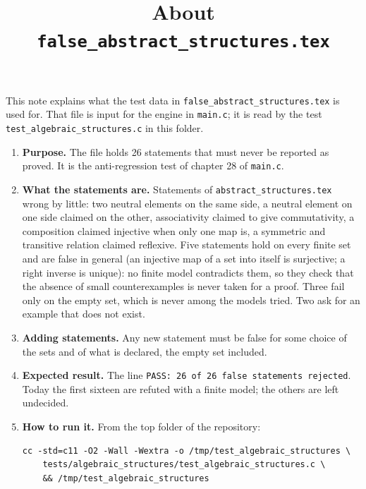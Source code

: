 \documentclass[11pt,a4paper]{article}
\title{About \texttt{false\_abstract\_structures.tex}}
\author{}
\date{}
\begin{document}
\maketitle
This note explains what the test data in \texttt{false\_abstract\_structures.tex} is used for. That file is input for the engine in \texttt{main.c}; it is read by the test \texttt{test\_algebraic\_structures.c} in this folder.

\begin{enumerate}
\item \textbf{Purpose.} The file holds 26 statements that must never be reported as proved. It is the anti-regression test of chapter 28 of \texttt{main.c}.

\item \textbf{What the statements are.} Statements of \texttt{abstract\_structures.tex} wrong by little: two neutral elements on the same side, a neutral element on one side claimed on the other, associativity claimed to give commutativity, a composition claimed injective when only one map is, a symmetric and transitive relation claimed reflexive. Five statements hold on every finite set and are false in general (an injective map of a set into itself is surjective; a right inverse is unique): no finite model contradicts them, so they check that the absence of small counterexamples is never taken for a proof. Three fail only on the empty set, which is never among the models tried. Two ask for an example that does not exist.

\item \textbf{Adding statements.} Any new statement must be false for some choice of the sets and of what is declared, the empty set included.

\item \textbf{Expected result.} The line \texttt{PASS: 26 of 26 false statements rejected}. Today the first sixteen are refuted with a finite model; the others are left undecided.

\item \textbf{How to run it.} From the top folder of the repository:
\begin{verbatim}
cc -std=c11 -O2 -Wall -Wextra -o /tmp/test_algebraic_structures \
    tests/algebraic_structures/test_algebraic_structures.c \
    && /tmp/test_algebraic_structures
\end{verbatim}
\end{enumerate}
\end{document}
